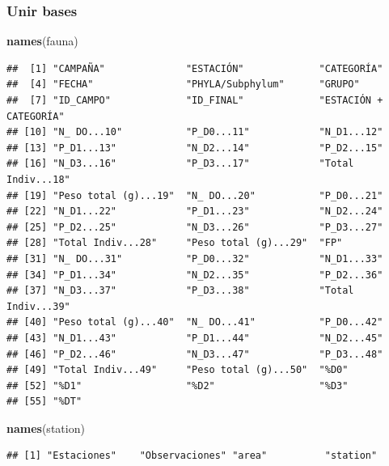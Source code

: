 \documentclass[
]{article}
\newenvironment{Shaded}{\begin{snugshade}}{\end{snugshade}}
\newcommand{\FunctionTok}[1]{\textcolor[rgb]{0.13,0.29,0.53}{\textbf{#1}}}
\newcommand{\NormalTok}[1]{#1}
\begin{document}
\hypertarget{unir-bases}{%
\subsubsection{Unir bases}\label{unir-bases}}

\begin{Shaded}
\begin{Highlighting}[]
\FunctionTok{names}\NormalTok{(fauna)}
\end{Highlighting}
\end{Shaded}

\begin{verbatim}
##  [1] "CAMPAÑA"              "ESTACIÓN"             "CATEGORÍA"           
##  [4] "FECHA"                "PHYLA/Subphylum"      "GRUPO"               
##  [7] "ID_CAMPO"             "ID_FINAL"             "ESTACIÓN + CATEGORÍA"
## [10] "N_ DO...10"           "P_D0...11"            "N_D1...12"           
## [13] "P_D1...13"            "N_D2...14"            "P_D2...15"           
## [16] "N_D3...16"            "P_D3...17"            "Total Indiv...18"    
## [19] "Peso total (g)...19"  "N_ DO...20"           "P_D0...21"           
## [22] "N_D1...22"            "P_D1...23"            "N_D2...24"           
## [25] "P_D2...25"            "N_D3...26"            "P_D3...27"           
## [28] "Total Indiv...28"     "Peso total (g)...29"  "FP"                  
## [31] "N_ DO...31"           "P_D0...32"            "N_D1...33"           
## [34] "P_D1...34"            "N_D2...35"            "P_D2...36"           
## [37] "N_D3...37"            "P_D3...38"            "Total Indiv...39"    
## [40] "Peso total (g)...40"  "N_ DO...41"           "P_D0...42"           
## [43] "N_D1...43"            "P_D1...44"            "N_D2...45"           
## [46] "P_D2...46"            "N_D3...47"            "P_D3...48"           
## [49] "Total Indiv...49"     "Peso total (g)...50"  "%D0"                 
## [52] "%D1"                  "%D2"                  "%D3"                 
## [55] "%DT"
\end{verbatim}

\begin{Shaded}
\begin{Highlighting}[]
\FunctionTok{names}\NormalTok{(station)}
\end{Highlighting}
\end{Shaded}

\begin{verbatim}
## [1] "Estaciones"    "Observaciones" "area"          "station"
\end{verbatim}
\end{document}
